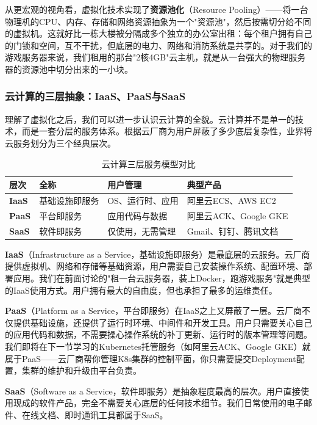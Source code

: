 从更宏观的视角看，虚拟化技术实现了\textbf{资源池化}（Resource Pooling）——将一台物理机的CPU、内存、存储和网络资源抽象为一个"资源池"，然后按需切分给不同的虚拟机。这就好比一栋大楼被分隔成多个独立的办公室出租：每个租户拥有自己的门锁和空间，互不干扰，但底层的电力、网络和消防系统是共享的。对于我们的游戏服务器来说，我们租用的那台"2核4GB"云主机，就是从一台强大的物理服务器的资源池中切分出来的一小块。

\subsubsection{云计算的三层抽象：IaaS、PaaS与SaaS}

理解了虚拟化之后，我们可以进一步认识云计算的全貌。云计算并不是单一的技术，而是一套分层的服务体系。根据云厂商为用户屏蔽了多少底层复杂性，业界将云服务划分为三个经典层次。

\begin{table}[htbp]
\centering
\begin{tabular}{|l|l|l|l|}
\hline
\textbf{层次} & \textbf{全称} & \textbf{用户管理} & \textbf{典型产品} \\
\hline
\textbf{IaaS} & 基础设施即服务 & OS、运行时、应用 & 阿里云ECS、AWS EC2 \\
\hline
\textbf{PaaS} & 平台即服务 & 应用代码与数据 & 阿里云ACK、Google GKE \\
\hline
\textbf{SaaS} & 软件即服务 & 仅使用，无需管理 & Gmail、钉钉、腾讯文档 \\
\hline
\end{tabular}
\caption{云计算三层服务模型对比}
\label{tab:cloud-service-layers}
\end{table}

\textbf{IaaS}（Infrastructure as a Service，基础设施即服务）是最底层的云服务。云厂商提供虚拟机、网络和存储等基础资源，用户需要自己安装操作系统、配置环境、部署应用。我们在前面讨论的"租一台云服务器，装上Docker，跑游戏服务"就是典型的IaaS使用方式。用户拥有最大的自由度，但也承担了最多的运维责任。

\textbf{PaaS}（Platform as a Service，平台即服务）在IaaS之上又屏蔽了一层。云厂商不仅提供基础设施，还提供了运行时环境、中间件和开发工具。用户只需要关心自己的应用代码和数据，不需要操心操作系统的补丁更新、运行时的版本管理等问题。我们即将在下一节学习的Kubernetes托管服务（如阿里云ACK、Google GKE）就属于PaaS——云厂商帮你管理K8s集群的控制平面，你只需要提交Deployment配置，集群的维护和升级由平台负责。

\textbf{SaaS}（Software as a Service，软件即服务）是抽象程度最高的层次。用户直接使用现成的软件产品，完全不需要关心底层的任何技术细节。我们日常使用的电子邮件、在线文档、即时通讯工具都属于SaaS。


